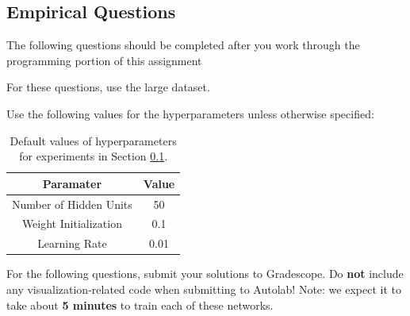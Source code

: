 \subsection{Empirical Questions }
\label{sec:interp}

The following questions should be completed after you work through the programming portion of this assignment

For these questions, use the large dataset.

Use the following values for the hyperparameters unless otherwise specified:

\begin{table}[H]
    \centering
    \begin{tabular}{|c|c|}
        \hline
        \textbf{Paramater} & \textbf{Value} \\
        \hline
        Number of Hidden Units & 50 \\
        \hline
        Weight Initialization & 0.1 \\
        \hline
        Learning Rate & 0.01 \\
        \hline
        
    \end{tabular}
    \caption{Default values of hyperparameters for experiments in Section \ref{sec:interp}.}
    \label{tab:params}
\end{table}
For the following questions, submit your solutions to Gradescope. Do {\bf not} include any visualization-related code when submitting to Autolab! Note: we expect it to take about {\bf 5 minutes} to train each of these networks.

